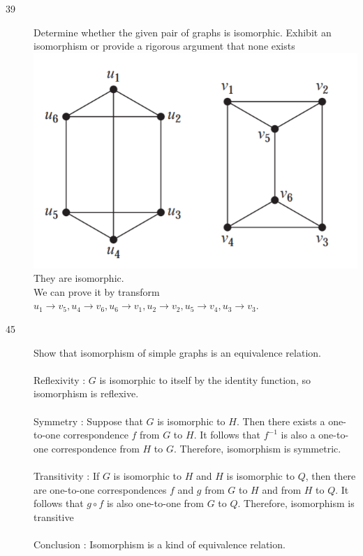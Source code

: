 \documentclass[UTF8]{article}
\begin{document}
\begin{description}
    \item[39]Determine whether the given pair of graphs is isomorphic. Exhibit an isomorphism or provide a rigorous argument that none exists  \\
        \includegraphics[scale=0.3]{../imgs/10_3_39.png}      \\
        They are isomorphic. \\
        We can prove it by transform $u_1 \to v_5, u_4 \to v_6, u_6 \to v_1, u_2 \to v_2, u_5 \to v_4, u_3 \to v_3$.  \\

    \item[45]Show that isomorphism of simple graphs is an equivalence relation. \\\\
            Reflexivity  : $G$ is isomorphic to itself by the identity function, so isomorphism is reflexive.   \\\\
            Symmetry     : Suppose that $G$ is isomorphic to $H$. Then there exists a one-to-one correspondence $f$ from $G$ to $H$. It follows that $f^{−1}$ is also a one-to-one correspondence from $H$ to $G$. Therefore, isomorphism is symmetric.    \\\\
            Transitivity : If $G$ is isomorphic to $H$ and $H$ is isomorphic to $Q$, then there are one-to-one correspondences $f$ and $g$ from $G$ to $H$ and from $H$ to $Q$. It follows that $g\circ f$ is also one-to-one from $G$ to $Q$. Therefore, isomorphism is transitive    \\\\
            Conclusion   : Isomorphism is a kind of equivalence relation. \\\\
\end{description}
\end{document}
